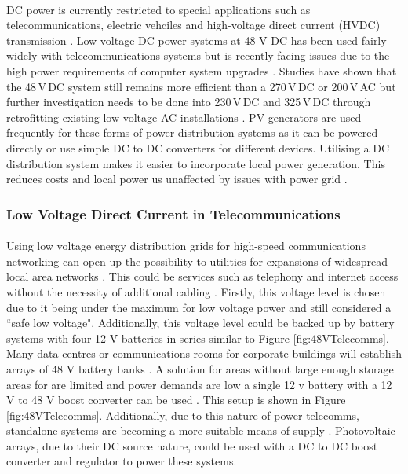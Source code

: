\paragraph{}
DC power is currently restricted to special applications such as telecommunications, electric vehciles and high-voltage direct current (HVDC) transmission \cite{Salomonsson2007}. Low-voltage DC power systems at 48 V DC has been used fairly widely with telecommunications systems but is recently facing issues due to the high power requirements of computer system upgrades \cite{Salomonsson2007}. Studies have shown that the 48\,V\,DC system still remains more efficient than a 270\,V\,DC or 200\,V\,AC but further investigation needs to be done into 230\,V\,DC and 325\,V\,DC through retrofitting existing low voltage AC installations \cite{Salomonsson2007}. PV generators are used frequently for these forms of power distribution systems as it can be powered directly or use simple DC to DC converters for different devices. Utilising a DC distribution system makes it easier to incorporate local power generation. This reduces costs and local power us unaffected by issues with power grid \cite{Starke2008a}. 

\subsubsection{Low Voltage Direct Current in Telecommunications}

\paragraph{}
Using low voltage energy distribution grids for high-speed communications networking can open up the possibility to utilities for expansions of widespread local area networks \cite{Waldeck1998}. This could be services such as telephony and internet access without the necessity of additional cabling \cite{Waldeck1998}. Firstly, this voltage level is chosen due to it being under the maximum for low voltage power and still considered a ``safe low voltage". Additionally, this voltage level could be backed up by battery systems with four 12 \si{V} batteries in series similar to Figure \ref{fig:48VTelecomms}. Many data centres or communications rooms for corporate buildings will establish arrays of 48 \si{V} battery banks \cite{website:48VTelecomms}. A solution for areas without large enough storage areas for are limited and power demands are low a single 12 \si{v} battery with a 12 \si{V} to 48 \si{V} boost converter can be used \cite{website:48VTelecomms}. This setup is shown in Figure \ref{fig:48VTelecomms}. Additionally, due to this nature of power telecomms, standalone systems are becoming a more suitable means of supply \cite{Ribeiro2009}. Photovoltaic arrays, due to their DC source nature, could be used with a DC to DC boost converter and regulator to power these systems.   

